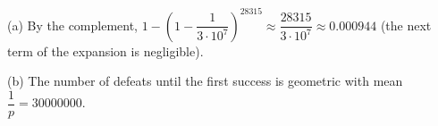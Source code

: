 (a) By the complement, $1-\left(1-\dfrac1{3\cdot10^7}\right)^{28315}\approx\dfrac{28315}{3\cdot10^7}\approx\boxed{0.000944}$ (the next term of the expansion is negligible).

(b) The number of defeats until the first success is geometric with mean $\dfrac1p=\boxed{30000000}$.
